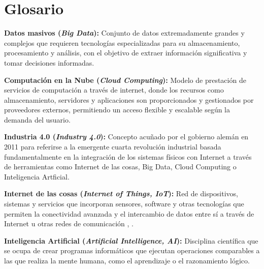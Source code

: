 \chapter{Glosario}\label{anexo:glosario}







\textbf{Datos masivos (\textit{Big Data}):} Conjunto de datos extremadamente grandes y complejos que requieren tecnologías especializadas para su almacenamiento, procesamiento y análisis, con el objetivo de extraer información significativa y tomar decisiones informadas.


\textbf{Computación en la Nube (\textit{Cloud Computing}):} Modelo de prestación de servicios de computación a través de internet, donde los recursos como almacenamiento, servidores y aplicaciones son proporcionados y gestionados por proveedores externos, permitiendo un acceso flexible y escalable según la demanda del usuario.








\textbf{Industria 4.0 (\textit{Industry 4.0}):} Concepto acuñado por el gobierno alemán en 2011 para referirse a la emergente cuarta revolución industrial basada fundamentalmente en la integración de los sistemas físicos con Internet a través de herramientas como Internet de las cosas, Big Data, Cloud Computing o Inteligencia Artficial.

\textbf{Internet de las cosas (\textit{Internet of Things, IoT}):} Red de dispositivos, sistemas y servicios que incorporan sensores, software y otras tecnologías que permiten la conectividad avanzada y el intercambio de datos entre sí a través de Internet u otras redes de comunicación \cite{oracleiot}, \cite{wikipediaiot}.

\textbf{Inteligencia Artificial (\textit{Artificial Intelligence, AI}):} Disciplina científica que se ocupa de crear programas informáticos que ejecutan operaciones comparables a las que realiza la mente humana, como el aprendizaje o el razonamiento lógico. \cite{rae}


